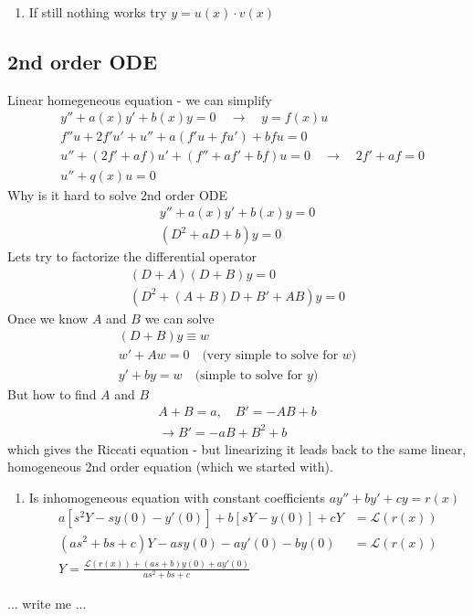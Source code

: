 \documentclass[10pt,a4paper]{book}
\theoremstyle{definition}
\begin{document}
\begin{enumerate}
\item If still nothing works try $y=u(x)\cdot v(x)$
\end{enumerate}

\subsection{2nd order ODE}
Linear homegeneous equation - we can simplify
\begin{align}
&y''+a(x)y'+b(x)y=0 \quad\rightarrow\quad y=f(x)u\\
&f''u+2f'u'+u''+a(f'u+fu')+bfu=0\\
&u''+(2f'+af)u'+(f''+af'+bf)u=0\quad\rightarrow\quad 2f'+af=0\\
&u''+q(x)u=0
\end{align}
Why is it hard to solve 2nd order ODE
\begin{align}
y''+a(x)y'+b(x)y=0\\
(D^2+aD+b)y=0
\end{align}
Lets try to factorize the differential operator
\begin{align}
(D+A)(D+B)y=0\\
(D^2+(A+B)D+B'+AB)y=0
\end{align}
Once we know $A$ and $B$ we can solve
\begin{align}
(D+B)y\equiv w\\
w'+Aw=0 \quad\text{(very simple to solve for $w$)}\\
y'+by=w \quad\text{(simple to solve for $y$)}
\end{align}
But how to find $A$ and $B$
\begin{align}
A+B=a, \quad B'=-AB+b\\
\rightarrow B'=-aB+B^2+b
\end{align}
which gives the Riccati equation - but linearizing it leads back to the same linear, homogeneous 2nd order equation (which we started with).

\begin{enumerate}
\item Is inhomogeneous equation with constant coefficients $ay''+by'+cy=r(x)$
\begin{align}
a[s^2Y-sy(0)-y'(0)]+b[sY-y(0)]+cY&=\mathcal{L}(r(x))\\
(as^2+bs+c)Y-asy(0)-ay'(0)-by(0)&=\mathcal{L}(r(x))\\
Y=\frac{\mathcal{L}(r(x))+(as+b)y(0)+ay'(0)}{as^2+bs+c}
\end{align}

\end{enumerate}
... write me ...
\end{document}
